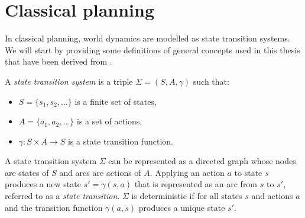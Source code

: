 \section{Classical planning}\label{subsec:Classical planning problem}
In classical planning, world dynamics are modelled as state transition systems. 
We will start by providing some definitions of general concepts used in this thesis that have been derived from \cite{ghallab2004automated}.


\begin{definition}
A \textit{state transition system} is a triple $\Sigma = (S, A, \gamma)$ such that:
\begin{itemize}
\item $S=\{s_1, s_2, \dots \}$ is a finite set of states,
\item $A=\{a_1, a_2, \dots \}$ is a set of actions,
\item $\gamma : S \times A \rightarrow S$ is a state transition function.
\end{itemize}
\end{definition}

A state transition system $\Sigma$ can be represented as a directed graph whose nodes are states of $S$ and arcs are actions of $A$. 
Applying an action $a$ to state $s$ produces a new state $s'= \gamma(s,a)$ that is represented as an arc from $s$ to $s'$, referred to as a  \textit{state transition}.
$\Sigma$ is deterministic if for all states $s$ and actions $a$ and the transition function $\gamma(a, s)$ produces a unique state $s'$. 





